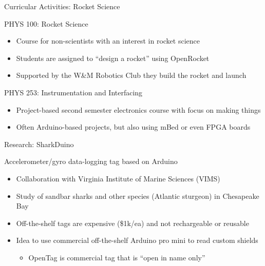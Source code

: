 \documentclass[xcolor=table,compress,professionalfonts,pdfpagelabels]{beamer}
\begin{document}
\begin{frame}{Curricular Activities: Rocket Science}
 \begin{block}{PHYS 100: Rocket Science}
  \begin{itemize}
   \item Course for non-scientists with an interest in rocket science
   \item Students are assigned to ``design a rocket'' using OpenRocket
   \item Supported by the W\&M Robotics Club they build the rocket and launch
  \end{itemize}
 \end{block}
 \begin{block}{PHYS 253: Instrumentation and Interfacing}
  \begin{itemize}
   \item Project-based second semester electronics course with focus on making things
   \item Often Arduino-based projects, but also using mBed or even FPGA boards
  \end{itemize}
 \end{block}
\end{frame}

\begin{frame}{Research: SharkDuino}
 \begin{block}{Accelerometer/gyro data-logging tag based on Arduino}
  \begin{itemize}
   \item Collaboration with Virginia Institute of Marine Sciences (VIMS)
   \item Study of sandbar sharks and other species (Atlantic sturgeon) in Chesapeake Bay
   \item Off-the-shelf tags are expensive (\$1k/ea) and not rechargeable or reusable
   \item Idea to use commercial off-the-shelf Arduino pro mini to read custom shields
    \begin{itemize}
     \item OpenTag is commercial tag that is ``open in name only''
    \end{itemize}
  \end{itemize}
 \end{block}
\end{frame}
\end{document}
